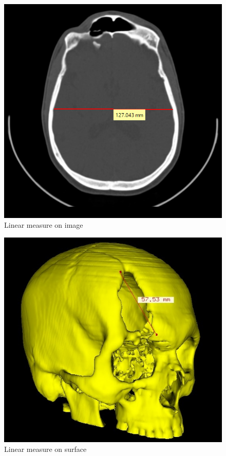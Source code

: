 \begin{figure}[!htb]
\centering
\includegraphics[scale=0.4]{../user_guide_figures/invesalius_screen/axial_linear.png}
\caption{Linear measure on image}
\label{fig:axial_linear}
\end{figure}

\begin{figure}[!htb]
\centering
\includegraphics[scale=0.3]{../user_guide_figures/invesalius_screen/3d_linear.jpg}
\caption{Linear measure on surface}
\label{fig:3d_linear}
\end{figure}

